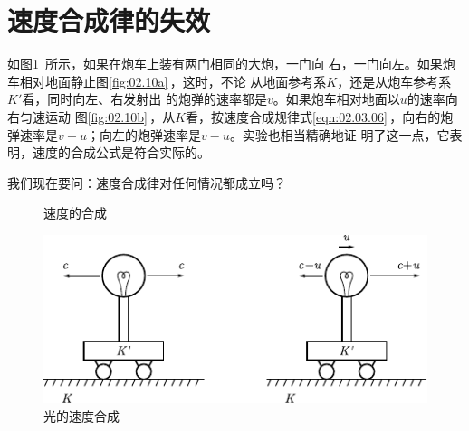 \section{速度合成律的失效}\label{sec:02.06}

如图\ref{fig:02.10}~所示，如果在炮车上装有两门相同的大炮，一门向
右，一门向左。如果炮车相对地面静止\lhbrak 图\ref{fig:02.10a}\,\rhbrak，这时，不论
从地面参考系$K$，还是从炮车参考系$K'$看，同时向左、右发射出
的炮弹的速率都是$v$。如果炮车相对地面以$u$的速率向右匀速运动
\lhbrak 图\ref{fig:02.10b}\,\rhbrak ，从$K$看，按速度合成规律\lhbrak 式\eqref{eqn:02.03.06}\,\rhbrak ，向右的炮
弹速率是$v+u$；向左的炮弹速率是$v-u$。实验也相当精确地证
明了这一点，它表明，速度的合成公式是符合实际的。

我们现在要问：速度合成律对任何情况都成立吗？

\clearpage
\begin{figure}
    \centering
    \hspace{2em}
    \caption{速度的合成}
    \label{fig:02.10}
\end{figure}

\begin{figure}
    \centering
    \includegraphics{figure/fig02.11}
    \caption{光的速度合成}
    \label{fig:02.11}
\end{figure}

